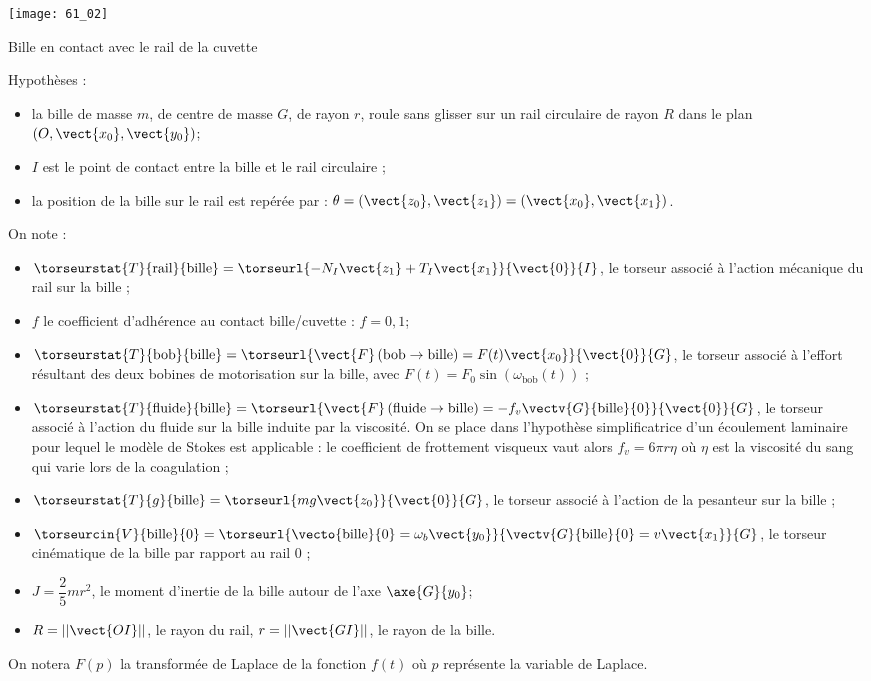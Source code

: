 \begin{marginfigure}
\centering
\texttt{[image: 61\_02]}
\caption{\label{61_02} Bille en contact avec le rail de la cuvette}
\end{marginfigure}

Hypothèses :
\begin{itemize}
\item la bille de masse $m$, de centre de masse $G$, de rayon $r$,
roule sans glisser sur un rail circulaire de rayon $R$ dans
le plan $\left(O,\vect{x_0},\vect{y_0}\right)$;
\item $I$ est le point de contact entre la bille et le rail circulaire ;
\item la position de la bille sur le rail est repérée par : $\theta = \left(\vect{z_0},\vect{z_1} \right)= \left(\vect{x_0},\vect{x_1} \right)$.
\end{itemize}

On note :
\begin{itemize}
\item $\torseurstat{T}{\text{rail}}{\text{bille}} = \torseurl{-N_I\vect{z_1}+T_I\vect{x_1}}{\vect{0}}{I}$, le torseur associé à l’action mécanique du rail sur la bille ;
\item $f$ le coefficient d’adhérence au contact bille/cuvette : $f=0,1$; 
\item $\torseurstat{T}{\text{bob}}{\text{bille}} = \torseurl{\vect{F}\left(\text{bob} \rightarrow \text{bille} \right)=F(t)\vect{x_0}}{\vect{0}}{G}$, le torseur associé à l’effort résultant des deux bobines de motorisation sur la bille, avec $F(t)=F_0\sin\left(\omega_{\text{bob}}(t)\right)$ ;
\item $\torseurstat{T}{\text{fluide}}{\text{bille}} = \torseurl{\vect{F}\left(\text{fluide} \rightarrow \text{bille} \right)=-f_v\vectv{G}{\text{bille}}{0}}{\vect{0}}{G}$, le torseur associé à
l’action du fluide sur la bille induite par la viscosité. On se place dans l’hypothèse
simplificatrice d’un écoulement laminaire pour lequel le modèle de Stokes est applicable : le
coefficient de frottement visqueux vaut alors $f_v = 6\pi r \eta $  où $\eta$ est la viscosité du sang qui
varie lors de la coagulation ;
\item $\torseurstat{T}{g}{\text{bille}} = \torseurl{mg\vect{z_0}}{\vect{0}}{G}$, le torseur associé à l’action de la pesanteur sur la bille ;
\item $\torseurcin{V}{\text{bille}}{0} = \torseurl{\vecto{\text{bille}}{0}=\omega_b \vect{y_0}}{\vectv{G}{\text{bille}}{0}=v\vect{x_1}}{G}$, le torseur cinématique de la bille par rapport au rail 0 ;
\item $J = \dfrac{2}{5}mr^2$, le moment d’inertie de la bille autour de l’axe $\axe{G}{y_0}$;
\item $R=||\vect{OI}||$, le rayon du rail, $r=||\vect{GI}||$, le rayon de la bille.
\end{itemize}
On notera $F(p)$ la transformée de Laplace de la fonction $f(t)$ où $p$ représente la variable de
Laplace.
\fi

